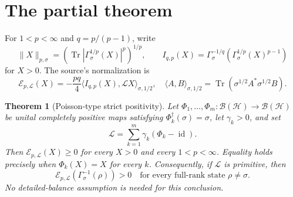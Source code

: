 \documentclass[11pt]{article}
\newtheorem{theorem}{Theorem}
\newcommand{\Tr}{\operatorname{Tr}}
\newcommand{\id}{\operatorname{id}}
\newcommand{\cE}{\mathcal E}
\newcommand{\cL}{\mathcal L}
\newcommand{\cB}{\mathcal B}
\newcommand{\GammaS}{\Gamma_\sigma}
\begin{document}
\section{The partial theorem}

For $1<p<\infty$ and $q=p/(p-1)$, write
\[
 \|X\|_{p,\sigma}
 =\left(\Tr\left|\GammaS^{1/p}(X)\right|^p\right)^{1/p},
 \qquad
 I_{q,p}(X)=\GammaS^{-1/q}
 \left(\GammaS^{1/p}(X)^{p-1}\right)
\]
for $X>0$.  The source's normalization is
\[
 \cE_{p,\cL}(X)
 =-\frac{pq}{4}\langle I_{q,p}(X),\cL X\rangle_{\sigma,1/2},
 \quad
 \langle A,B\rangle_{\sigma,1/2}
 =\Tr(\sigma^{1/2}A^*\sigma^{1/2}B).
\]

\begin{theorem}[Poisson-type strict positivity]\label{thm:main}
Let $\Phi_1,\ldots,\Phi_m:\cB(\mathcal H)\to\cB(\mathcal H)$ be unital
completely positive maps satisfying $\Phi_k^\dagger(\sigma)=\sigma$, let
$\gamma_k>0$, and set
\[
 \cL=\sum_{k=1}^m\gamma_k(\Phi_k-\id).
\]
Then $\cE_{p,\cL}(X)\ge0$ for every $X>0$ and every $1<p<\infty$.
Equality holds precisely when $\Phi_k(X)=X$ for every $k$.  Consequently, if
$\cL$ is primitive, then
\[
 \cE_{p,\cL}(\GammaS^{-1}(\rho))>0
 \quad\text{for every full-rank state }\rho\ne\sigma.
\]
No detailed-balance assumption is needed for this conclusion.
\end{theorem}
\end{document}
